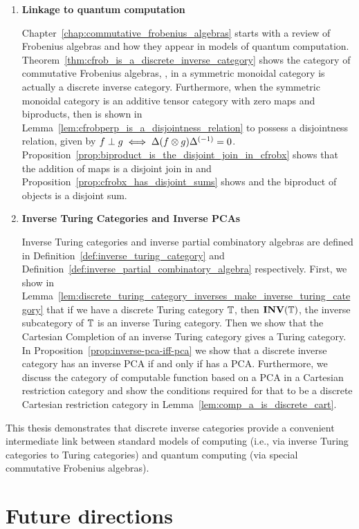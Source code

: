 \begin{enumerate}
\item \textbf{Linkage to quantum computation}

Chapter~\ref{chap:commutative_frobenius_algebras} starts with a review of Frobenius algebras and how
they appear in models of quantum computation. Theorem~\ref{thm:cfrob_is_a_discrete_inverse_category}
shows the category of commutative Frobenius algebras, \CFrob, in a symmetric monoidal category \X
is actually a discrete inverse category. Furthermore, when the symmetric monoidal category \X is an
additive tensor category with zero maps and biproducts, then \CFrob is shown in
Lemma~\ref{lem:cfrobperp_is_a_disjointness_relation} to possess a disjointness relation, given by
$f\perp g \iff \Delta(f\otimes g){\Delta}^{(-1)} =
0$. Proposition~\ref{prop:biproduct_is_the_disjoint_join_in_cfrobx} shows that the addition of maps
is a disjoint join in \CFrob and Proposition~\ref{prop:cfrobx_has_disjoint_sums} shows and the
biproduct of objects is a disjoint sum.

\item \textbf{Inverse Turing Categories and Inverse PCAs}

Inverse Turing categories and inverse partial combinatory algebras are defined in
Definition~\ref{def:inverse_turing_category} and
Definition~\ref{def:inverse_partial_combinatory_algebra} respectively. First, we show in
Lemma~\ref{lem:discrete_turing_category_inverses_make_inverse_turing_category} that if we have a
discrete Turing category $\mathbb{T}$, then $\mathbf{INV}({\mathbb{T}})$, the inverse subcategory of $\mathbb{T}$ is an inverse Turing
category. Then we show that the Cartesian Completion of an inverse Turing category gives a Turing
category. In Proposition~\ref{prop:inverse-pca-iff-pca} we show that a discrete inverse category \X
has an inverse PCA if and only if \Xt has a PCA. Furthermore, we discuss the category of computable
function based on a PCA in a Cartesian restriction category and show the conditions required for
that to be a discrete Cartesian restriction category in Lemma~\ref{lem:comp_a_is_discrete_cart}.
\end{enumerate}

This thesis demonstrates that discrete inverse categories provide a convenient intermediate link
between standard models of computing (i.e., via inverse Turing categories to Turing categories) and
quantum computing (via special commutative Frobenius algebras).

\section{Future directions}
\label{sec:whither-next}

